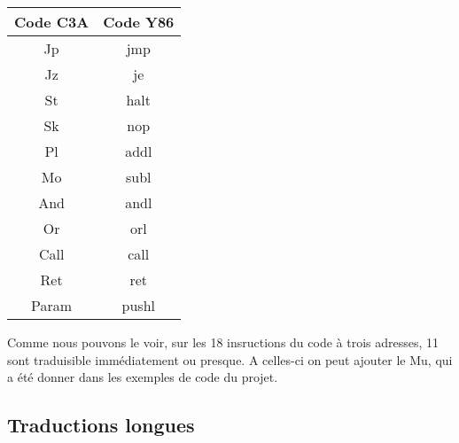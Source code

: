 \documentclass{article}
\begin{document}
\begin{center}
    \begin{tabular}{|c|c|}
        \hline
        Code C3A & Code Y86 \\
        \hline
        \hline
        Jp & jmp\\ \hline
        Jz & je\\ \hline
        St & halt\\ \hline
        Sk & nop\\ \hline
        Pl & addl \\ \hline
        Mo & subl \\ \hline
        And & andl \\ \hline
        Or & orl \\ \hline
        Call & call \\ \hline
        Ret & ret \\ \hline
        Param & pushl \\ \hline
    \end{tabular}
\end{center}


Comme nous pouvons le voir, sur les 18 insructions du code à trois adresses, 11 sont traduisible immédiatement ou presque. A celles-ci on peut ajouter le Mu, qui a été donner dans les exemples de code du projet.

\subsection{Traductions longues}
\end{document}
